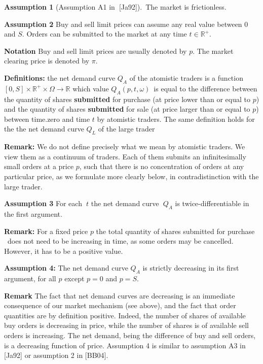 \documentclass{article}
\begin{document}
\textbf{Assumption 1 }(Assumption A1 in\textbf{\ }[Ja92]).\ The market is
frictionless.

\bigskip

\textbf{Assumption 2 }Buy and sell limit prices can assume any real value
between $0$ and $S$. Orders can be submitted to the market at any time $t\in 
\mathbb{R}^{+}$.

\bigskip

\textbf{Notation} Buy and sell limit prices are usually denoted by $p$. The
market clearing price is denoted by $\pi $.

\bigskip

\textbf{Definitions: }the net demand curve $Q_{A}$ of the atomistic traders
is a function $[0,S]\times \mathbb{R}^{+}\times \Omega \mathbb{\rightarrow R}
$ which value $Q_{A}(p,t,\omega )$\ is equal to the difference between the
quantity of shares \textbf{submitted} for purchase (at price lower than or
equal to $p$) and the quantity of shares \textbf{submitted} for sale (at
price larger than or equal to $p$) between time.zero and time $t$ by
atomistic traders. The same definition holds for the the net demand curve $%
Q_{L}$ of the large trader

\bigskip

\textbf{Remark: }We do not define precisely what we mean by atomistic
traders. We view them as a continuum of traders. Each of them submits an
infinitesimally small orders at a price $p$, such that there is no
concentration of orders at any particular price, as we formulate more
clearly below, in contradistinction with the large trader.

\bigskip

\textbf{Assumption 3 }For each\textbf{\ }$t$ the net demand curve\textbf{\ }$%
Q_{A}$ is twice-differentiable in the first argument.

\bigskip

\textbf{Remark:} For a fixed price $p$ the total quantity of shares
submitted for purchase \ does not need to be increasing in time, as some
orders may be cancelled. However, it has to be a positive value.

\bigskip

\textbf{Assumption 4: }The net demand curve $Q_{A}$ is strictly decreasing
in its first argument, for all $p$ except $p=0$ and $p=S$.

\bigskip

\textbf{Remark} The fact that net demand curves are decreasing is an
immediate consequence of our market mechanism (see above), and the fact that
order quantities are by definition positive. Indeed, the number of shares of
available buy orders is decreasing in price, while the number of shares is
of available sell orders is increasing. The net demand, being the difference
of buy and sell orders, is a decreasing function of price. Assumption 4 is
similar to assumption A3 in [Ja92] or assumption 2 in [BB04].
\end{document}
